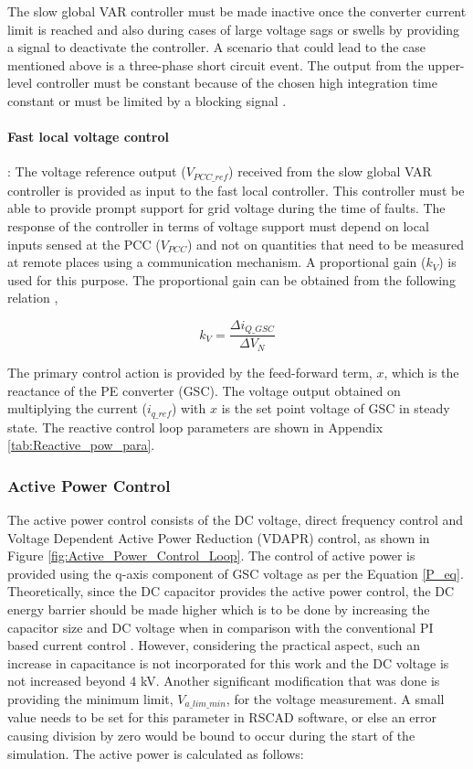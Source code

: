 The slow global VAR controller must be made inactive once the converter current limit is reached and also during cases of large voltage sags or swells by providing a signal to deactivate the controller. A scenario that could lead to the case mentioned above is a three-phase short circuit event. The output from the upper-level controller must be constant because of the chosen high integration time constant or must be limited by a blocking signal \cite{korai_dynamic_2019}.

\paragraph{Fast local voltage control}:
The voltage reference output ($V_{PCC\_ref}$) received from the slow global VAR controller is provided as input to the fast local controller. This controller must be able to provide prompt support for grid voltage during the time of faults. The response of the controller in terms of voltage support must depend on local inputs sensed at the \gls{PCC} ($V_{PCC}$) and not on quantities that need to be measured at remote places using a communication mechanism. A proportional gain ($k_V$) is used for this purpose. The proportional gain can be obtained from the following relation \cite{korai_dynamic_2019},

\begin{equation}
    k_V = \frac{\Delta i_{Q\_GSC}}{\Delta V_N }
\end{equation}

The primary control action is provided by the feed-forward term, $x$, which is the reactance of the \gls{PE} converter (\gls{GSC}). The voltage output obtained on multiplying the current ($i_{q\_ref}$) with $x$ is the set point voltage of \gls{GSC} in steady state. The reactive control loop parameters are shown in Appendix \ref{tab:Reactive_pow_para}.

\subsubsection{Active Power Control}\label{Active_power_DVC_theory}
The active power control consists of the \gls{DC} voltage, direct frequency control and Voltage Dependent Active Power Reduction (\gls{VDAPR}) control, as shown in Figure \ref{fig:Active_Power_Control_Loop}. The control of active power is provided using the q-axis component of \gls{GSC} voltage as per the Equation \ref{P_eq}. Theoretically, since the \gls{DC} capacitor provides the active power control, the \gls{DC} energy barrier should be made higher which is to be done by increasing the capacitor size and \gls{DC} voltage when in comparison with the conventional \gls{PI} based current control \cite{korai_dynamic_2019}. However, considering the practical aspect, such an increase in capacitance is not incorporated for this work and the \gls{DC} voltage is not increased beyond 4 kV. Another significant modification that was done is providing the minimum limit, $V_{a\_lim\_min}$, for the voltage measurement. A small value needs to be set for this parameter in RSCAD software, or else an error causing division by zero would be bound to occur during the start of the simulation. The active power is calculated as follows: 

